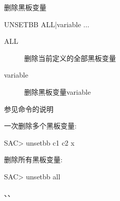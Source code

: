 \label{cmd:unsetbb}

删除黑板变量

\begin{SACSTX}
UNSETBB ALL|variable ...
\end{SACSTX}

\begin{description}
\item [ALL] 删除当前定义的全部黑板变量
\item [variable] 删除黑板变量variable
\end{description}

参见命令的说明

一次删除多个黑板变量:
\begin{SACCode}
SAC> unsetbb c1 c2 x
\end{SACCode}

删除所有黑板变量:
\begin{SACCode}
SAC> unsetbb all
\end{SACCode}

、、
